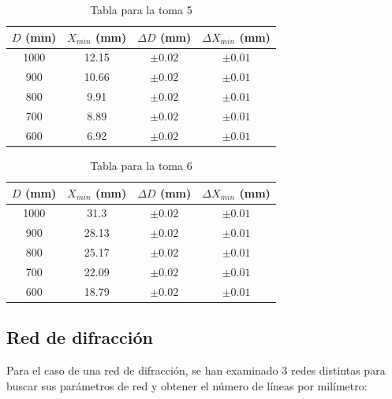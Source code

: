 \documentclass[11pt, a4paper, twocolumn]{article}
\begin{document}
\begin{table}[H]
    \caption{Tabla para la toma 5 }
    \centering
    \small
    \setlength{\tabcolsep}{4pt}
    \begin{tabular}{cccc}
        \hline
        $D$ (mm) &   $X_{min}$ (mm) & $\Delta D$ (mm)  & $\Delta X_{min}$ (mm) \\
        \hline
            1000 &      12.15 & $\pm 0.02$   & $\pm 0.01$    \\
            900 &      10.66  & $\pm 0.02$    & $\pm 0.01$   \\
            800 &       9.91  & $\pm 0.02$    & $\pm 0.01$   \\
            700 &       8.89  & $\pm 0.02$    & $\pm 0.01$   \\
            600 &       6.92 & $\pm 0.02$    & $\pm 0.01$   \\
        \hline
    \end{tabular}

\end{table}

\vspace{0.5cm}

\begin{table}[H]
    \caption{Tabla para la toma 6 }
    \centering
    \small
    \setlength{\tabcolsep}{4pt}
    \begin{tabular}{cccc}
        \hline
        $D$ (mm) &   $X_{min}$ (mm) & $\Delta D$ (mm)  & $\Delta X_{min}$ (mm)\\
        \hline
            1000 &      31.3   & $\pm 0.02$   & $\pm 0.01$    \\
            900 &      28.13 & $\pm 0.02$   & $\pm 0.01$    \\
            800 &      25.17  & $\pm 0.02$   & $\pm 0.01$    \\
            700 &      22.09 & $\pm 0.02$   & $\pm 0.01$    \\
            600 &      18.79 & $\pm 0.02$   & $\pm 0.01$    \\
        \hline
    \end{tabular}
\end{table}

\subsection{Red de difracción}
Para el caso de una red de difracción, se han examinado 3 redes distintas para buscar sus parámetros de red y obtener el número de líneas por milímetro:
\end{document}
